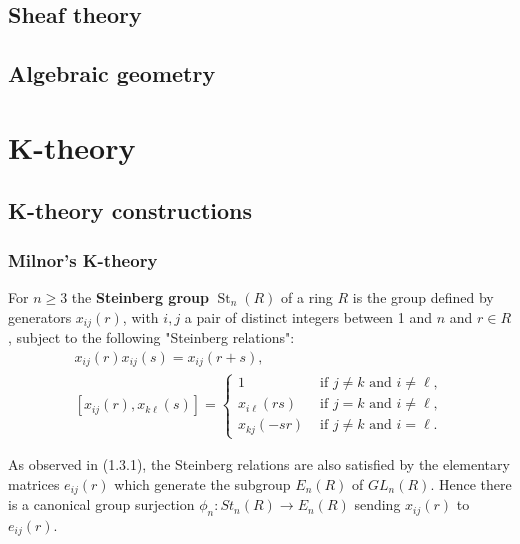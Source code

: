 \documentclass{book}
\begin{document}
\chapter{Sheaf theory}

\chapter{Algebraic geometry}





\part{K-theory}
\chapter{K-theory constructions} 

\section{Milnor's K-theory}

For $n \geq 3$ the \textbf{Steinberg group} $\operatorname{St}_n(R)$ of a ring $R$ is the group defined by generators $x_{i j}(r)$, with $i, j$ a pair of distinct integers between 1 and $n$ and $r \in R$, subject to the following "Steinberg relations":
$$
\begin{gathered}
x_{i j}(r) x_{i j}(s)=x_{i j}(r+s), \\
{\left[x_{i j}(r), x_{k \ell}(s)\right]= \begin{cases}1 & \text { if } j \neq k \text { and } i \neq \ell, \\
x_{i \ell}(r s) & \text { if } j=k \text { and } i \neq \ell, \\
x_{k j}(-s r) & \text { if } j \neq k \text { and } i=\ell .\end{cases} }
\end{gathered}
$$

As observed in (1.3.1), the Steinberg relations are also satisfied by the elementary matrices $e_{i j}(r)$ which generate the subgroup $E_n(R)$ of $G L_n(R)$. Hence there is a canonical group surjection $\phi_n: S t_n(R) \rightarrow E_n(R)$ sending $x_{i j}(r)$ to $e_{i j}(r)$.
\end{document}
